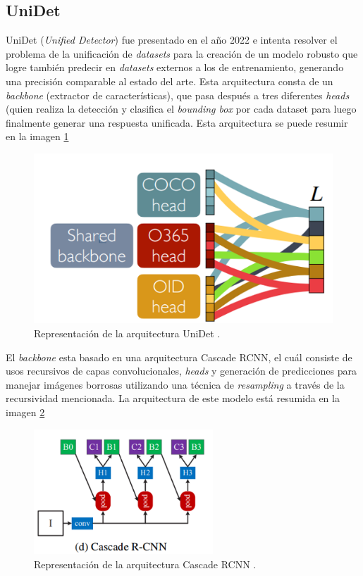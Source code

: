 \subsection{UniDet}

UniDet (\textit{Unified Detector}) fue presentado en el año 2022 e intenta resolver el problema de la unificación de \textit{datasets} para la creación de un modelo robusto que logre también predecir en \textit{datasets} externos a los de entrenamiento, generando una precisión comparable al estado del arte. Esta arquitectura consta de un \textit{backbone} (extractor de características), que pasa después a tres diferentes \textit{heads} (quien realiza la detección y clasifica el \textit{bounding box} por cada dataset para luego finalmente generar una respuesta unificada. Esta arquitectura se puede resumir en la imagen \ref{fig:unidet}

\begin{figure}[h!]
\includegraphics[width=1\textwidth]{images/imagenUnidet.png}
\centering
\caption{Representación de la arquitectura UniDet \protect\cite{unidet}.}
\label{fig:unidet}
\end{figure}

El \textit{backbone} esta basado en una arquitectura Cascade RCNN, el cuál consiste de usos recursivos de capas convolucionales, \textit{heads} y generación de predicciones para manejar imágenes borrosas utilizando una técnica de \textit{resampling} a través de la recursividad mencionada. La arquitectura de este modelo está resumida en la imagen \ref{fig:cascade}

\begin{figure}[h!]
\includegraphics[width=0.6\textwidth]{images/cascadercnn.png}
\centering
\caption{Representación de la arquitectura Cascade RCNN \protect\cite{cascadercnn}.}
\label{fig:cascade}
\end{figure}

